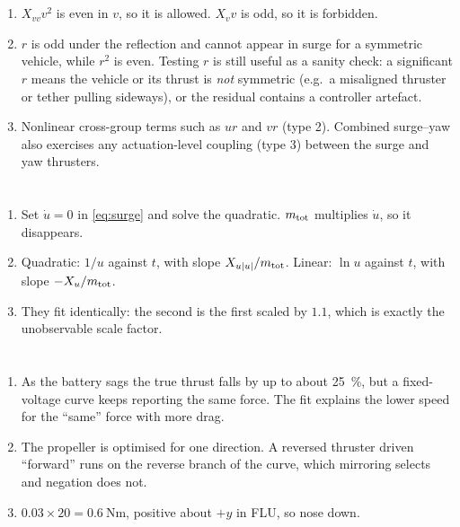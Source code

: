 \section*{}
\begin{enumerate}
  \item $X_{vv}v^2$ is even in $v$, so it is allowed. $X_v v$ is odd, so it is forbidden.
  \item $r$ is odd under the reflection and cannot appear in surge for a symmetric vehicle, while $r^2$
        is even. Testing $r$ is still useful as a sanity check: a significant $r$ means the
        vehicle or its thrust is \emph{not} symmetric (e.g.\ a misaligned thruster or tether
        pulling sideways), or the residual contains a controller artefact.
  \item Nonlinear cross-group terms such as $ur$ and $vr$ (type 2). Combined surge--yaw also
        exercises any actuation-level coupling (type 3) between the surge and yaw thrusters.
\end{enumerate}

\section*{}
\begin{enumerate}
  \item Set $\dot u = 0$ in \eqref{eq:surge} and solve the quadratic. $m_\mathrm{tot}$ multiplies
        $\dot u$, so it disappears.
  \item Quadratic: $1/u$ against $t$, with slope $X_{u|u|}/m_\mathrm{tot}$. Linear: $\ln u$ against $t$, with
        slope $-X_u/m_\mathrm{tot}$.
  \item They fit identically: the second is the first scaled by $1.1$, which is exactly the
        unobservable scale factor.
\end{enumerate}

\section*{}
\begin{enumerate}
  \item As the battery sags the true thrust falls by up to about \qty{25}{\percent}, but a
        fixed-voltage curve keeps reporting the same force. The fit explains the lower speed for
        the ``same'' force with more drag.
  \item The propeller is optimised for one direction. A reversed thruster driven ``forward''
        runs on the reverse branch of the curve, which mirroring selects and negation does not.
  \item $0.03 \times 20 = \qty{0.6}{\newton\meter}$, positive about $+y$ in FLU, so nose down.
\end{enumerate}

